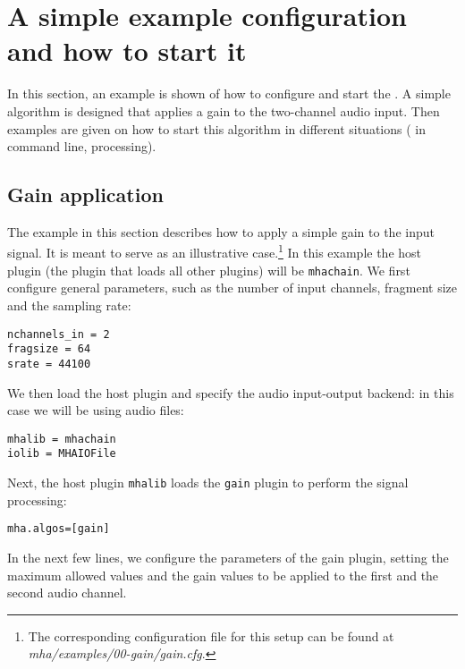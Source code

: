 
\section{A simple example configuration and how to start it}%
\label{sec:scenarios}%
%
%
%

In this section, an example is shown of how to configure and start the
\mha{}. A simple algorithm is designed that applies a gain to the two-channel audio input.
Then examples are given on how to start this algorithm in different situations (\mhad{} in command line, \Matlab{} processing).

\subsection{Gain application}%
\label{sec:dyncmp}%

The example in this section describes how to apply a simple gain to the input signal.
It is meant to serve as an illustrative case.\footnote{
  The corresponding configuration file for this setup can be found at
  \emph{mha/examples/00-gain/gain.cfg}.
}
%
In this example the host plugin (the plugin that loads all other
plugins) will be \verb!mhachain!.
%
We first configure general parameters, such as the number of input 
channels, fragment size and the sampling rate:
\begin{verbatim}
nchannels_in = 2
fragsize = 64
srate = 44100
\end{verbatim}
%
We then load the host plugin and specify the audio input-output backend:
in this case we will be using audio files:
\begin{verbatim}
mhalib = mhachain
iolib = MHAIOFile
\end{verbatim}
%
Next, the host plugin \verb!mhalib! loads the \verb!gain! plugin
to perform the signal processing:
\begin{verbatim}
mha.algos=[gain]
\end{verbatim}
%
In the next few lines, we configure the parameters of the gain
plugin, setting the maximum allowed values and the gain values to be applied to the first and the second audio channel. 
%

